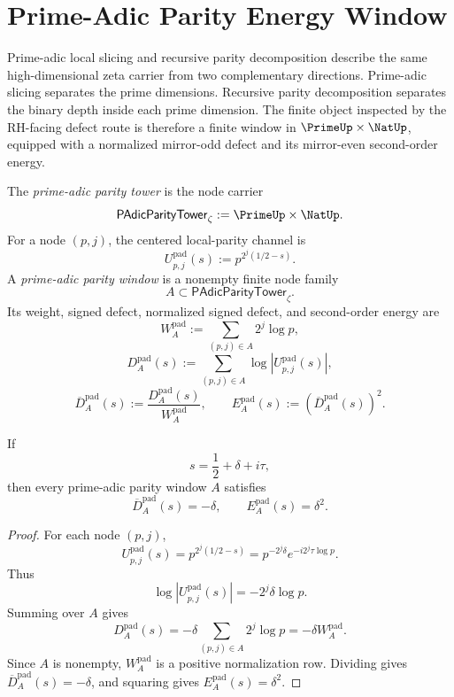 \section{Prime-Adic Parity Energy Window}
\label{sec:unified-reality-prime-adic-parity-energy-window}


Prime-adic local slicing and recursive parity decomposition describe the
same high-dimensional zeta carrier from two complementary directions.
Prime-adic slicing separates the prime dimensions.  Recursive parity
decomposition separates the binary depth inside each prime dimension.
The finite object inspected by the RH-facing defect route is therefore a
finite window in $\PrimeUp\times\NatUp$, equipped with a normalized
mirror-odd defect and its mirror-even second-order energy.

\begin{definition}
\label{def:unified-reality-prime-adic-parity-window}
The \emph{prime-adic parity tower} is the node carrier
$$
\mathsf{PAdicParityTower}_{\zeta}:=\PrimeUp\times\NatUp.
$$
For a node $(p,j)$, the centered local-parity channel is
$$
U_{p,j}^{\mathrm{pad}}(s):=p^{2^j(1/2-s)}.
$$
A \emph{prime-adic parity window} is a nonempty finite node family
$$
A\subset\mathsf{PAdicParityTower}_{\zeta}.
$$
Its weight, signed defect, normalized signed defect, and second-order
energy are
$$
W_A^{\mathrm{pad}}
:=
\sum_{(p,j)\in A}2^j\log p,
$$
$$
D_A^{\mathrm{pad}}(s)
:=
\sum_{(p,j)\in A}\log |U_{p,j}^{\mathrm{pad}}(s)|,
$$
$$
\overline D_A^{\mathrm{pad}}(s)
:=
\frac{D_A^{\mathrm{pad}}(s)}{W_A^{\mathrm{pad}}},
\qquad
E_A^{\mathrm{pad}}(s)
:=
\left(\overline D_A^{\mathrm{pad}}(s)\right)^2.
$$
\end{definition}

\begin{theorem}
\label{thm:unified-reality-prime-adic-parity-windows-read-one-normal-coordinate}
If
$$
s=\frac12+\delta+i\tau,
$$
then every prime-adic parity window $A$ satisfies
$$
\overline D_A^{\mathrm{pad}}(s)=-\delta,
\qquad
E_A^{\mathrm{pad}}(s)=\delta^2.
$$
\end{theorem}

\begin{proof}
For each node $(p,j)$,
$$
U_{p,j}^{\mathrm{pad}}(s)
=
p^{2^j(1/2-s)}
=
p^{-2^j\delta}e^{-i2^j\tau\log p}.
$$
Thus
$$
\log |U_{p,j}^{\mathrm{pad}}(s)|=-2^j\delta\log p.
$$
Summing over $A$ gives
$$
D_A^{\mathrm{pad}}(s)
=
-\delta\sum_{(p,j)\in A}2^j\log p
=
-\delta W_A^{\mathrm{pad}}.
$$
Since $A$ is nonempty, $W_A^{\mathrm{pad}}$ is a positive normalization
row.  Dividing gives $\overline D_A^{\mathrm{pad}}(s)=-\delta$, and
squaring gives $E_A^{\mathrm{pad}}(s)=\delta^2$.
\end{proof}

